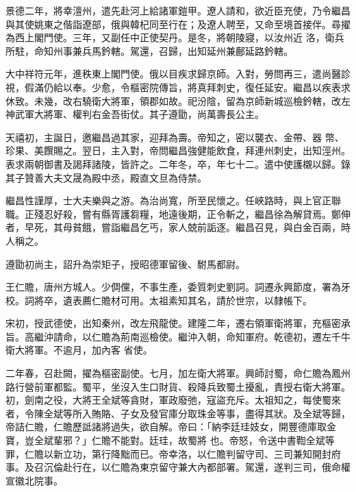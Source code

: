 \begin{pinyinscope}
 景德二年，將幸澶州，遣先赴河上給諸軍鎧甲。遼人請和，欲近臣充使，乃令繼昌與其使姚東之偕詣遼部，俄與韓杞同至行在；及遼人聘至，又命至境首接伴。尋擢為西上閣門使。三年，又副任中正使契丹。是冬，將朝陵寢，以汝州近
 洛，衛兵所駐，命知州事兼兵馬鈐轄。駕還，召歸，出知延州兼鄜延路鈐轄。



 大中祥符元年，進秩東上閣門使。俄以目疾求歸京師。入對，勞問再三，遣尚醫診視，假滿仍給以奉。少愈，令樞密院傳旨，將真拜刺史，復任延安。繼昌以疾表求休致。未幾，改右驍衛大將軍，領郡如故。祀汾陰，留為京師新城巡檢鈐轄，改左神武軍大將軍、權判右金吾街仗。其子遵勖，尚萬壽長公主。



 天禧初，主誕日，邀繼昌過其家，迎拜為壽。帝知之，密以襲衣、金帶、器
 幣、珍果、美饌賜之。翌日，主入對，帝問繼昌強健能飲食，拜連州刺史，出知涇州。表求兩朝御書及謁拜諸陵，皆許之。二年冬，卒，年七十二。遣中使護櫬以歸。錄其子贊善大夫文晟為殿中丞，殿直文旦為侍禁。



 繼昌性謹厚，士大夫樂與之游。為治尚寬，所至民懷之。任峽路時，與上官正聯職。正殘忍好殺，嘗有縣胥護芻糧，地遠後期，正令斬之，繼昌徐為解貸焉。鄭伸者，早死，其母貧餓，嘗詣繼昌乞丐，家人兢前詬逐。繼昌召見，與白金百兩，時
 人稱之。



 遵勖初尚主，詔升為崇矩子，授昭德軍留後、駙馬都尉。



 王仁贍，唐州方城人。少倜儻，不事生產，委質刺史劉詞。詞遷永興節度，署為牙校。詞將卒，遺表薦仁贍材可用。太祖素知其名，請於世宗，以隸帳下。



 宋初，授武德使，出知秦州，改左飛龍使。建隆二年，遷右領軍衛將軍，充樞密承旨。高繼沖請命，以仁贍為荊南巡檢使。繼沖入朝，命知軍府。乾德初，遷左千牛衛大將軍。不逾月，加內客
 省使。



 二年春，召赴闕，擢為樞密副使。七月，加左衛大將軍。興師討蜀，命仁贍為鳳州路行營前軍都監。蜀平，坐沒入生口財貨、殺降兵致蜀土擾亂，責授右衛大將軍。初，劍南之役，大將王全斌等貪財，軍政廢弛，寇盜充斥。太祖知之，每使蜀來者，令陳全斌等所入賄賂、子女及發官庫分取珠金等事，盡得其狀。及全斌等歸，帝詰仁贍，仁贍歷詆諸將過失，欲自解。帝曰：「納李廷珪妓女，開豐德庫取金寶，豈全斌輩邪？」仁贍不能對。廷珪，故蜀將
 也。帝怒，令送中書鞫全斌等罪，仁贍以新立功，第行降黜而已。帝幸洛，以仁贍判留守司、三司兼知開封府事。及召沉倫赴行在，以仁贍為東京留守兼大內都部署。駕還，遂判三司，俄命權宣徽北院事。




\end{pinyinscope}
